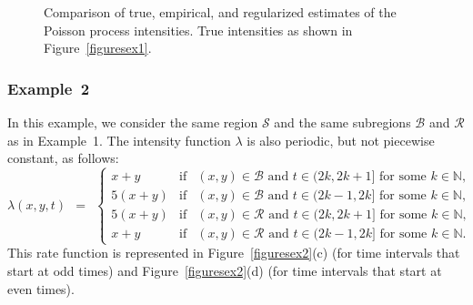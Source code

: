 \documentclass[article]{jss}
\begin{document}
\begin{figure}
\centering
\resizebox{\textwidth}{!}{
\begin{tabular}{cc}
\texttt{[image: rates2site1v3.pdf]} &
\texttt{[image: rates2site6v3.pdf]} \\
$\hspace*{0.6cm}$ $N_{i,t} = 14$, zone $1 \in \mathcal{I}_{\mathcal{R}}$ & $\hspace*{0.6cm}$ $N_{i,t} = 14
$, zone $6 \in \mathcal{I}_{\mathcal{B}}$
\vspace{5mm} \\
\texttt{[image: rates20site1v3.pdf]}&
\texttt{[image: rates20site6v3.pdf]}\\
$\hspace*{0.6cm}$ $N_{i,t} = 140$, zone $1 \in \mathcal{I}_{\mathcal{R}}$ & $\hspace*{0.6cm}$ $N_{i,t} = 140$, zone $6 \in \mathcal{I}_{\mathcal{B}}$
\vspace{5mm}
\end{tabular}}
\caption{\label{figureserrth}
Comparison of true, empirical, and regularized estimates of the Poisson process intensities.
True intensities as shown in Figure~\ref{figuresex1}.}
\end{figure}


\subsubsection{Example~2}
\label{sec:example 2}

In this example, we consider the same region $\mathcal{S}$ and the same subregions $\mathcal{B}$ and $\mathcal{R}$ as in Example~1.
The intensity function $\lambda$ is also periodic, but not piecewise constant, as follows:
\[
\lambda(x,y,t) \ \ = \ \ \left\{
\begin{array}{lcl}
x + y & \mbox{if} & (x,y) \in \mathcal{B} \mbox{ and } t \in (2k,2k+1] \mbox{ for some } k \in \mathbb{N}, \\
5 (x + y) & \mbox{if} & (x,y) \in \mathcal{B} \mbox{ and } t \in (2k-1,2k] \mbox{ for some } k \in \mathbb{N}, \\
5 (x + y) & \mbox{if} & (x,y) \in \mathcal{R} \mbox{ and } t \in (2k,2k+1] \mbox{ for some } k \in \mathbb{N}, \\
x + y & \mbox{if} & (x,y) \in \mathcal{R} \mbox{ and } t \in (2k-1,2k] \mbox{ for some } k \in \mathbb{N}.
\end{array}\right.
\]
This rate function is represented in Figure~\ref{figuresex2}(c) (for time intervals that start at odd times) and Figure~\ref{figuresex2}(d) (for time intervals that start at even times). 
\end{document}
